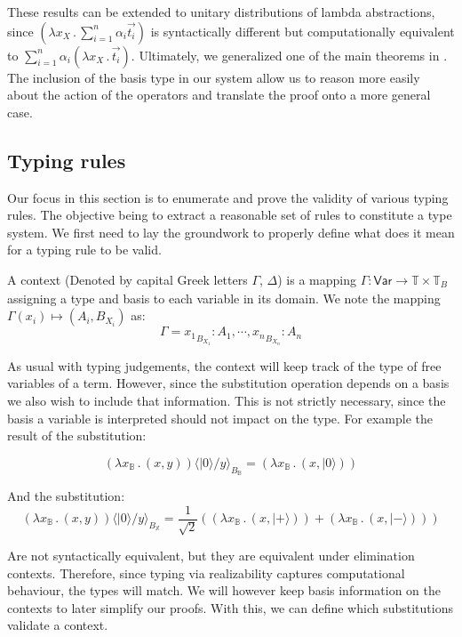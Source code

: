 \documentclass[runningheads,orivec,envcountsame,envcountsect]{llncs}
\newcommand\ket[1]{\ensuremath{|#1\rangle}}
\newcommand\Var{\ensuremath{\mathsf{Var}}}
\newcommand\ansubst[2]{\ensuremath{\langle #1 \rangle_{#2}}}
\def\Pair#1#2{(#1,#2)} %
\def\Lam#1#2#3{\lambda#1_{#2}\,{.}\,#3} %
\def\Type{\mathbb{T}}
\def\BasisType{\Type_{\basis{}}}
\newcommand\B{\mathbb B}
\newcommand\XB{\mathbb X}
\newcommand\basis[1]{\ensuremath{B_{ #1 }}}
\begin{document}
These results can be extended to unitary distributions of lambda abstractions, since $(\Lam{x}{X}{\sum_{i=1}^{n}\alpha_i \vec{t_i}})$ is syntactically different but computationally equivalent to $\sum_{i=1}^{n}\alpha_i (\Lam{x}{X}{\vec{t_i}})$. Ultimately, we generalized one of the main theorems in \cite{DiazcaroGuillermoMiquelValironLICS19}. The inclusion of the basis type in our system allow us to reason more easily about the action of the operators and translate the proof onto a more general case. 


\subsection{Typing rules}    
Our focus in this section is to enumerate and prove the validity of various typing rules. The objective being to extract a reasonable set of rules to constitute a type system. We first need to lay the groundwork to properly define what does it mean for a typing rule to be valid.

\begin{definition}
    A context (Denoted by capital Greek letters $\Gamma$, $\Delta$) is a mapping $\Gamma:\Var\to\Type\times\BasisType$ assigning a type and basis to each variable in its domain. We note the mapping $\Gamma(x_i)\mapsto(A_i, \basis{X_i})$ as:
    \[
    \Gamma = {x_1}_{\basis{X_1}}:A_1,\dotsb, {x_n}_{\basis{X_n}}:A_n
    \]
\end{definition}

As usual with typing judgements, the context will keep track of the type of free variables of a term. However, since the substitution operation depends on a basis we also wish to include that information. This is not strictly necessary, since the basis a variable is interpreted should not impact on the type. For example the result of the substitution:

\[
(\Lam{x}{\B}{\Pair{x}{y}})\ansubst{\ket{0}/y}{\basis{\B}} = (\Lam{x}{\B}{\Pair{x}{\ket{0}}})
\]

And the substitution:
\[
(\Lam{x}{\B}{(x, y)})\ansubst{\ket{0}/y}{\basis{\XB}} = \frac{1}{\sqrt{2}} ((\Lam{x}{\B}{\Pair{x}{\ket{+}}}) + (\Lam{x}{\B}{\Pair{x}{\ket{-}}}))
\]

Are not syntactically equivalent, but they are equivalent under elimination contexts. Therefore, since typing via realizability captures computational behaviour, the types will match. We will however keep basis information on the contexts to later simplify our proofs. With this, we can define which substitutions validate a context.
\end{document}
